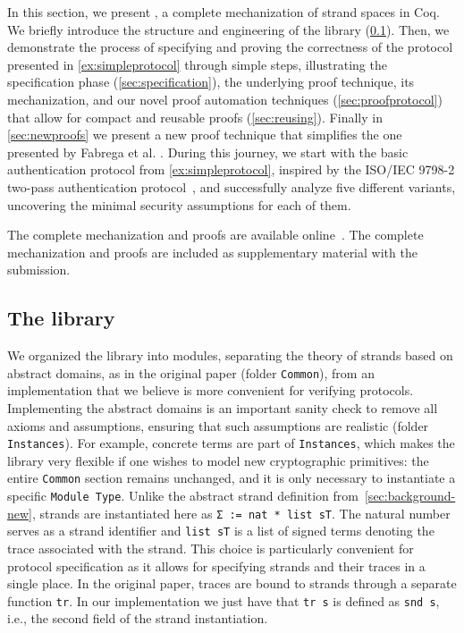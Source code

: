 
In this section,
we present \easystrands, a complete mechanization of strand spaces in Coq.
We briefly introduce the structure and engineering of the library (\cref{sec:library}). Then, we demonstrate the process of specifying and proving the correctness of the protocol presented in \cref{ex:simpleprotocol} through simple steps, illustrating the specification phase (\cref{sec:specification}), the underlying proof technique, its mechanization, and our novel proof automation techniques (\cref{sec:proofprotocol}) that allow for compact and reusable proofs (\cref{sec:reusing}).
Finally in \cref{sec:newproofs} we present a new proof technique that simplifies the one presented by Fabrega et al. \cite{FHG98}.
During this journey, we start with the basic authentication protocol from \cref{ex:simpleprotocol}, inspired by the ISO/IEC 9798-2 two-pass authentication protocol~\cite{ISO97982}, and successfully analyze five different variants, uncovering the minimal security assumptions for each of them.

\ifdefined\CAMERAREADY
   The complete mechanization and proofs are available online~\cite{strandsrocqcode}.
\else
   The complete mechanization and proofs are included as supplementary material with the submission.
\fi

\subsection{The \easystrands{} library}
\label{sec:library}
We organized the library into modules, separating the theory of strands based on abstract domains, as in the original paper (folder \lstinline|Common|), from an implementation that we believe is more convenient for verifying protocols.
Implementing the abstract domains is an important sanity check to remove all axioms and assumptions, ensuring that such assumptions are realistic (folder \lstinline|Instances|).
For example, concrete terms are part of \lstinline|Instances|, which makes the library very flexible if one wishes to model new cryptographic primitives: the entire \lstinline|Common| section remains unchanged, and it is only necessary to instantiate a specific \lstinline|Module Type|.
Unlike the abstract strand definition from~\cref{sec:background-new}, strands are instantiated here as \lstinline|Σ := nat * list sT|.
The natural number serves as a strand identifier and \lstinline|list sT| is a list of signed terms denoting the trace associated with the strand.
This choice is particularly convenient for protocol specification as it allows for specifying strands and their traces in a single place.
In the original paper, traces are bound to strands through a separate function \lstinline|tr|.
In our implementation we just have that \lstinline|tr s| is defined as \lstinline|snd s|, i.e., the second field of the strand instantiation.

